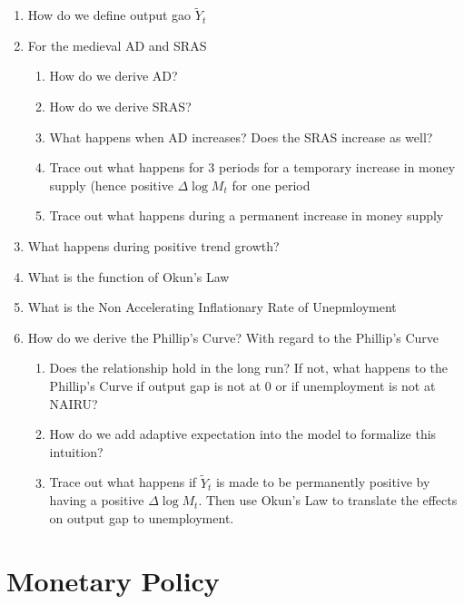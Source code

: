 \documentclass[11pt]{scrartcl}
\begin{document}
\begin{enumerate}
\item How do we define output gao $\tilde{Y}_t$
\item For the medieval AD and SRAS
\begin{enumerate}
\item How do we derive AD?
\item How do we derive SRAS?
\item What happens when AD increases? Does the SRAS increase as well? 
\item Trace out what happens for 3 periods for a temporary increase in money supply (hence positive $\Delta \log{M_t}$ for one period
\item Trace out what happens during a permanent increase in money supply
\end{enumerate}
\item What happens during positive trend growth?
\item What is the function of Okun's Law
\item What is the Non Accelerating Inflationary Rate of Unepmloyment
\item How do we derive the Phillip's Curve? With regard to the Phillip's Curve
\begin{enumerate}
\item Does the relationship hold in the long run? If not, what happens to the Phillip's Curve if output gap is not at 0 or if unemployment is not at NAIRU?
\item How do we add adaptive expectation into the model to formalize this intuition?
\item Trace out what happens if $\tilde{Y}_t$ is made to be permanently positive by having a positive $\Delta \log{M_t}$. Then use Okun's Law to translate the effects on output gap to unemployment.
\end{enumerate}
\end{enumerate}

\section{Monetary Policy}
\end{document}
